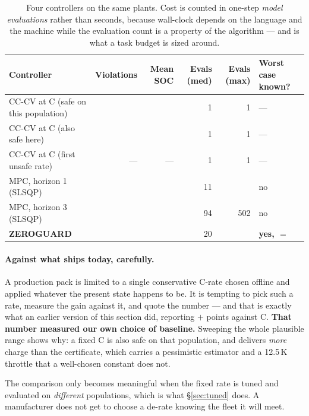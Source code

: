 \documentclass[11pt,letterpaper]{article}
\theoremstyle{definition}
\theoremstyle{remark}
\begin{document}
\begin{table}[t]\centering\small
\caption{Four controllers on the same plants. Cost is counted in one-step \emph{model
evaluations} rather than seconds, because wall-clock depends on the language and the machine
while the evaluation count is a property of the algorithm --- and is what a task budget is
sized around.}
\label{tab:baselines}
\begin{tabular}{@{}lrrrrl@{}}
\toprule
\textbf{Controller} & \textbf{Violations} & \textbf{Mean SOC} & \textbf{Evals (med)} &
\textbf{Evals (max)} & \textbf{Worst case known?} \\
\midrule
CC-CV at \bDerateC{}C (safe on this population) & \bViolDerate{} & \bSocDerate{} & 1 & 1 & --- \\
CC-CV at \bFastestSafeC{}C (also safe here) & \bViolOneC{} & \bSocOneC{} & 1 & 1 & --- \\
CC-CV at \bAggrC{}C (first unsafe rate) & --- & --- & 1 & 1 & --- \\
MPC, horizon 1 (SLSQP) & \bViolMpcOne{} & \bSocMpcOne{} & 11 & \bMpcMaxEval{} & no \\
MPC, horizon 3 (SLSQP) & \bViolMpcThree{} & \bSocMpcThree{} & 94 & 502 & no \\
\textbf{ZEROGUARD} & \textbf{\bViolZg{}} & \textbf{\bSocZg{}} & 20 & \textbf{\bZgEval{}} &
\textbf{yes, $=$ \bZgEval{}} \\
\bottomrule
\end{tabular}
\end{table}

\paragraph{Against what ships today, carefully.} A production pack is limited to a single
conservative C-rate chosen offline and applied whatever the present state happens to be. It is
tempting to pick such a rate, measure the gain against it, and quote the number --- and that is
exactly what an earlier version of this section did, reporting $+$\bGainPts{} points against
\bDerateC{}C. \textbf{That number measured our own choice of baseline.} Sweeping the whole
plausible range shows why: a fixed \bFastestSafeC{}C is also safe on that population, and
delivers \emph{more} charge than the certificate, which carries a pessimistic estimator and a
12.5\,K throttle that a well-chosen constant does not.

The comparison only becomes meaningful when the fixed rate is tuned and evaluated on
\emph{different} populations, which is what \S\ref{sec:tuned} does. A manufacturer does not get
to choose a de-rate knowing the fleet it will meet.
\end{document}
